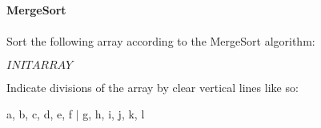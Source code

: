\documentclass[12pt]{article}
\begin{document}
    \textbf{\LARGE{\color{tumgadPurple} MergeSort}}\\
    \\
    \noindent
    Sort the following array according to the MergeSort algorithm:
    \begin{center}
        $INITARRAY$
    \end{center}
    Indicate divisions of the array by clear vertical lines like so:
    \noindent
    \begin{center}
        a, b, c, d, e, f $|$ g, h, i, j, k, l\\
        \vspace{10px}
    \end{center}
    \noindent{}
\end{document}

